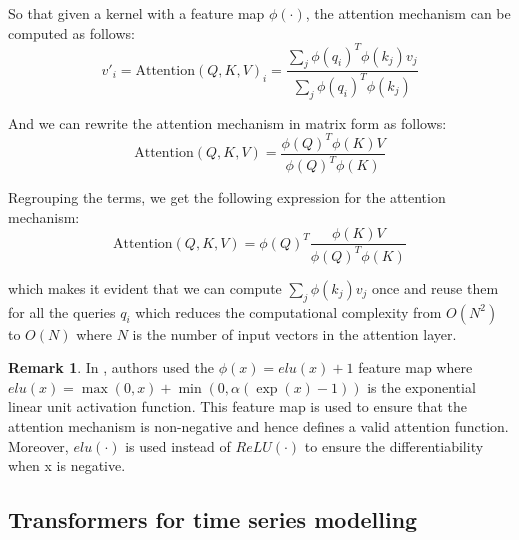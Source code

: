 \documentclass[a4paper, twoside]{report}
\theoremstyle{definition}
\newtheorem{remark}[theorem]{Remark}
\numberwithin{equation}{section}
\begin{document}
So that given a kernel with a feature map $\phi(\cdot)$, the attention mechanism can be computed as follows:
\begin{equation}
    v'_i=\text{Attention}(Q, K, V)_i=\frac{\sum_j \phi(q_i)^T \phi(k_j) v_j}{\sum_j \phi(q_i)^T \phi(k_j)}
\end{equation}

And we can rewrite the attention mechanism in matrix form as follows:
\begin{equation}
    \text{Attention}(Q, K, V)=\frac{\phi(Q)^T \phi(K) V}{\phi(Q)^T \phi(K)}
\end{equation}

Regrouping the terms, we get the following expression for the attention mechanism:
\begin{equation}
    \text{Attention}(Q, K, V)=\phi(Q)^T \frac{\phi(K) V}{\phi(Q)^T \phi(K)}
\end{equation}

which makes it evident that we can compute $\sum_j \phi(k_j) v_j$ once and reuse them for all the queries $q_i$
which reduces the computational complexity from $O(N^2)$ to $O(N)$ where $N$ is the number of input vectors
in the attention layer.

\begin{remark}
    In \cite{2006.16236}, authors used the $\phi(x)=elu(x)+1$ feature map where
    $elu(x)=\max(0, x)+\min(0, \alpha(\exp(x)-1))$ is the exponential linear unit activation function.
    This feature map is used to ensure that the attention mechanism is non-negative
    and hence defines a valid attention function. Moreover, $elu(\cdot)$ is used instead of $ReLU(\cdot)$
    to ensure the differentiability when x is negative.
\end{remark}






\subsection{Transformers for time series modelling}
\end{document}
